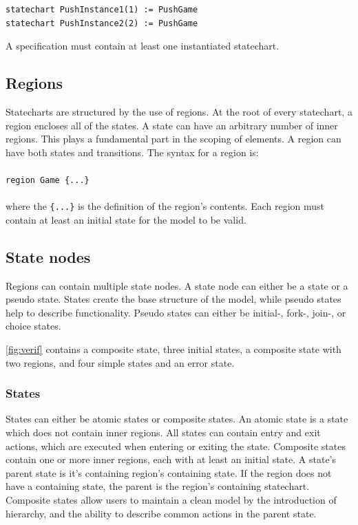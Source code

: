 \begin{lstlisting}
statechart PushInstance1(1) := PushGame
statechart PushInstance2(2) := PushGame
\end{lstlisting}

A specification must contain at least one instantiated statechart.
  \subsection{Regions}
Statecharts are structured by the use of regions. At the root of every statechart, a region encloses all of the states. A state can have an arbitrary number of inner regions. This plays a fundamental part in the scoping of elements. A region can have both states and transitions. The syntax for a region is:
\\\\\verb!region Game {...}!\\\\
where the \verb!{...}! is the definition of the region's contents. Each region must contain at least an initial state for the model to be valid.
  \subsection{State nodes}
Regions can contain multiple state nodes. A state node can either be a state or a pseudo state. States create the base structure of the model, while pseudo states help to describe functionality. Pseudo states can either be initial-, fork-, join-, or choice states.

\cref{fig:verif} contains a composite state, three initial states, a composite state with two regions, and four simple states and an error state.

    \subsubsection{States}
States can either be atomic states or composite states. An atomic state is a state which does not contain inner regions. All states can contain entry and exit actions, which are executed when entering or exiting the state. Composite states contain one or more inner regions, each with at least an initial state. A state's parent state is it's containing region's containing state. If the region does not have a containing state, the parent is the region's containing statechart. Composite states allow users to maintain a clean model by the introduction of hierarchy, and the ability to describe common actions in the parent state.

